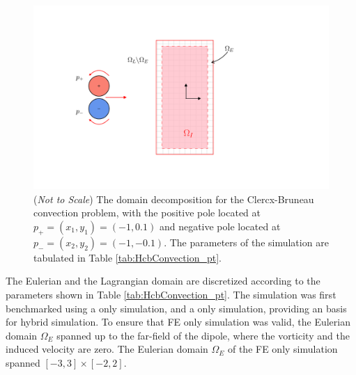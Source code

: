 	\begin{figure}[!h]
	\centering
	\includegraphics[trim=0cm 2.5cm 0cm 2.5cm, clip, width=\linewidth]{./figures/validation/cbConv/hcbconv_dd.pdf}
	\caption{(\textit{Not to Scale}) The domain decomposition for the Clercx-Bruneau convection problem, with the positive pole located at $p_{+}=(x_1,y_1) = (-1,0.1)$ and negative pole located at $p_{-}=(x_2,y_2)=(-1,-0.1)$. The parameters of the simulation are tabulated in Table \ref{tab:HcbConvection_pt}.}
	\label{fig:hcbconv_dd}
	\end{figure}
	
The Eulerian and the Lagrangian domain are discretized according to the parameters shown in Table \ref{tab:HcbConvection_pt}. The simulation was first benchmarked using a  only simulation, and a  only simulation, providing an basis for hybrid simulation. To ensure that FE only simulation was valid, the Eulerian domain $\Omega_E$ spanned up to the far-field of the dipole, where the vorticity and the induced velocity are zero. The Eulerian domain $\Omega_E$ of the FE only simulation spanned $[-3,3]\times[-2,2]$. %

